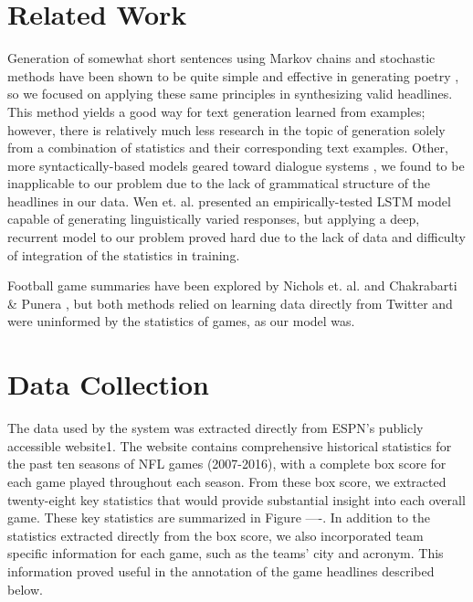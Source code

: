 \documentclass[12pt, journal]{IEEEtran}
\begin{document}

%
%
\section{Related Work}
Generation of somewhat short sentences using Markov chains and stochastic methods have
been shown to be quite simple and effective in generating poetry \cite{1}\cite{2}, so we focused on applying these same principles in synthesizing valid headlines. This method yields a good way for text generation learned from examples; however, there is relatively much less research in the topic of generation solely from a combination of statistics and their corresponding text examples. Other, more syntactically-based models geared toward dialogue systems \cite{3}\cite{4}, we found to be inapplicable to our problem due to the lack of grammatical structure of the headlines in our data. Wen et. al. \cite{5} presented an empirically-tested LSTM model capable of generating linguistically varied responses, but applying a deep, recurrent model to our problem proved hard due to the lack of data and difficulty of integration of the statistics in training.

Football game summaries have been explored by Nichols et. al. \cite{6} and Chakrabarti \& Punera \cite{7}, but both methods relied on learning data directly from Twitter and were uninformed by the statistics of games, as our model was. 

\section{Data Collection}

The data used by the system was extracted directly from ESPN's publicly accessible website1. The website contains comprehensive historical statistics for the past ten seasons of NFL games (2007-2016), with a complete box score for each game played throughout each season. From these box score, we extracted twenty-eight key statistics that would provide substantial insight into each overall game. These key statistics are summarized in Figure ----. In addition to the statistics extracted directly from the box score, we also incorporated team specific information for each game, such as the teams' city and acronym. This information proved useful in the annotation of the game headlines described below.
\end{document}
